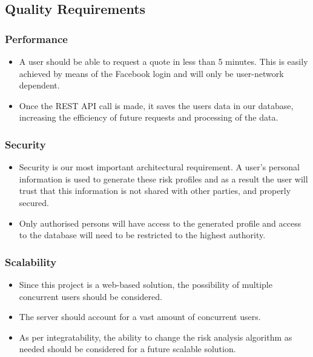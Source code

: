\documentclass{article}
\begin{document}
	
	\subsection{Quality Requirements}
		\subsubsection{Performance}
		\begin{itemize}
			\item A user should be able to request a quote in less than 5 minutes. This is easily achieved by means of the Facebook login and will only be user-network dependent.
			\item Once the REST API call is made, it saves the users data in our database, increasing the efficiency of future requests and processing of the data.
		\end{itemize}
		 
		\subsubsection{Security}
		\begin{itemize}
			\item Security is our most important architectural requirement. A user's personal information is used to generate these risk profiles and as a result the user will trust that this information is not shared with other parties, and properly secured.
			\item Only authorised persons will have access to the generated profile and access to the database will need to be restricted to the highest authority.
		\end{itemize}
		\subsubsection{Scalability}
		\begin{itemize}
			\item Since this project is a web-based solution, the possibility of multiple concurrent users should be considered.
			\item The server should account for a vast amount of concurrent users.
			\item As per integratability, the ability to change the risk analysis algorithm as needed should be considered for a future scalable solution.
		\end{itemize}
\end{document}
